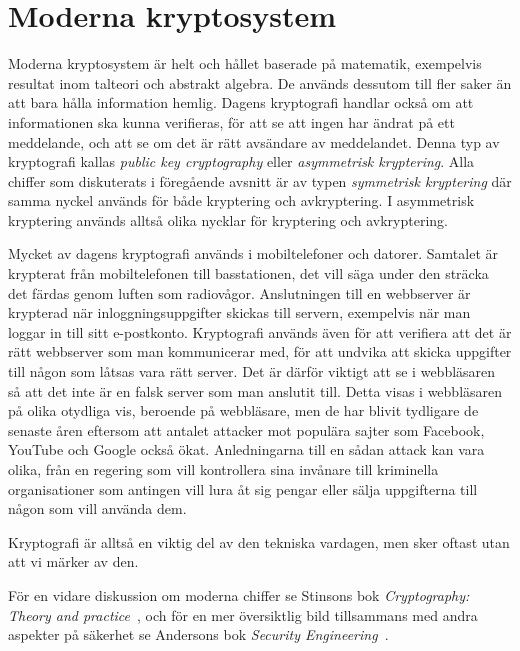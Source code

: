 \section{Moderna kryptosystem}
Moderna kryptosystem är helt och hållet baserade på matematik, exempelvis 
resultat inom talteori och abstrakt algebra.
De används dessutom till fler saker än att bara hålla information hemlig.
Dagens kryptografi handlar också om att informationen ska kunna verifieras, för 
att se att ingen har ändrat på ett meddelande, och att se om det är rätt 
avsändare av meddelandet.
Denna typ av kryptografi kallas \emph{public key cryptography}
 eller 
\emph{asymmetrisk kryptering}.
Alla chiffer som diskuterats i föregående avsnitt är av typen \emph{symmetrisk 
kryptering} där samma 
nyckel används för både kryptering och avkryptering.
I asymmetrisk kryptering används alltså olika nycklar för kryptering och 
avkryptering.

Mycket av dagens kryptografi används i mobiltelefoner och datorer.
Samtalet är krypterat från mobiltelefonen till basstationen, det vill säga 
under den sträcka det färdas genom luften som radiovågor.
Anslutningen till en webbserver är krypterad när inloggningsuppgifter skickas 
till servern, exempelvis när man loggar in till sitt e-postkonto.
Kryptografi används även för att verifiera att det är rätt webbserver som man 
kommunicerar med, för att undvika att skicka uppgifter till någon som låtsas 
vara rätt server.
Det är därför viktigt att se i webbläsaren så att det inte är en falsk server 
som man anslutit till.
Detta visas i webbläsaren på olika otydliga vis, beroende på webbläsare, men de 
har blivit tydligare de senaste åren eftersom att antalet attacker mot populära 
sajter som Facebook, YouTube och Google också ökat.
Anledningarna till en sådan attack kan vara olika, från en regering som vill 
kontrollera sina invånare till kriminella organisationer som antingen vill lura 
åt sig pengar eller sälja uppgifterna till någon som vill använda dem.

Kryptografi är alltså en viktig del av den tekniska vardagen, men sker oftast 
utan att vi märker av den.

För en vidare diskussion om moderna chiffer se Stinsons bok \emph{Cryptography: 
Theory and practice}~\cite{Stinson2006cta}, och för en mer översiktlig bild 
tillsammans med andra aspekter på säkerhet se Andersons bok \emph{Security 
Engineering}~\cite{Anderson2008sea}.

